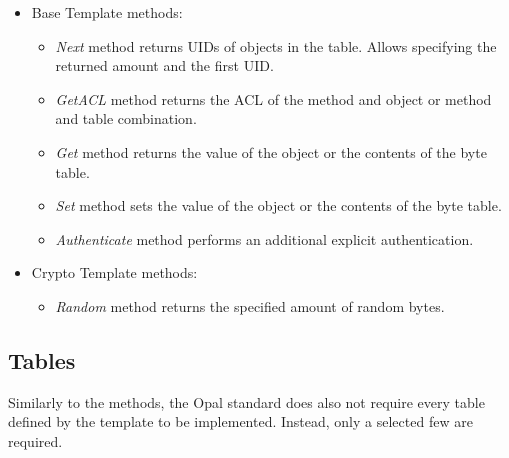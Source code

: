 \begin{itemize}
    \item Base Template methods:
\begin{itemize}
\item \emph{Next} method returns UIDs of objects in the table. Allows specifying the returned amount and the first UID.
\item \emph{GetACL} method returns the ACL of the method and object or method and table combination.
\item \emph{Get} method returns the value of the object or the contents of the byte table.
\item \emph{Set} method sets the value of the object or the contents of the byte table.
\item \emph{Authenticate} method performs an additional explicit authentication.
\end{itemize}
    \item Crypto Template methods:
\begin{itemize}
\item \emph{Random} method returns the specified amount of random bytes.
\end{itemize}
\end{itemize}

\subsection{Tables}
\label{admin_sp_tables}

Similarly to the methods, the Opal standard does also not require every table defined by the template to be implemented. Instead, only a selected few are required.

